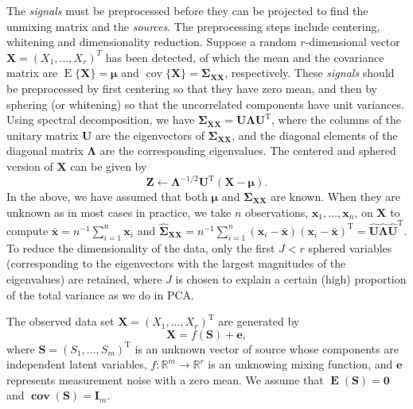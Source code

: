The \textit{signals} must be preprocessed before they can be projected to find the unmixing matrix and the \textit{sources}. The preprocessing steps include centering, whitening and dimensionality reduction. Suppose a random $r$-dimensional vector $\mathbf{X}=(X_1,\dots,X_r)^T$ has been detected, of which the mean and the covariance matrix are $\operatorname{E}\{\mathbf{X}\}=\boldsymbol{\mu}$ and $\operatorname{cov}\{\mathbf{X}\}=\boldsymbol{\Sigma}_{\mathbf{XX}}$, respectively. These \textit{signals} should be preprocessed by first centering so that they have zero mean, and then by sphering (or whitening) so that the uncorrelated components have unit variances. Using spectral decomposition, we have $\boldsymbol{\Sigma}_{\mathbf{XX}}=\mathbf{U}\boldsymbol{\Lambda}\mathbf{U}^{\operatorname{T}}$, where the columns of the unitary matrix $\mathbf{U}$ are the eigenvectors of $\boldsymbol{\Sigma}_{\mathbf{XX}}$, and the diagonal elements of the diagonal matrix $\boldsymbol{\Lambda}$ are the corresponding eigenvalues. The centered and sphered version of $\mathbf{X}$ can be given by
\begin{equation}
    \mathbf{Z}\leftarrow \boldsymbol{\Lambda}^{-1/2}\mathbf{U}^{\operatorname{T}}(\mathbf{X}-\boldsymbol{\mu}).
\end{equation}
In the above, we have assumed that both $\boldsymbol{\mu}$ and $\boldsymbol{\Sigma}_{\mathbf{XX}}$ are known. When they are unknown as in most cases in practice, we take $n$ observations, $\mathbf{x}_1, \dots, \mathbf{x}_n$, on $\mathbf{X}$ to compute $\bar{\mathbf{x}}=n^{-1}\sum_{i=1}^n\mathbf{x}_i$ and $\hat{\boldsymbol{\Sigma}}_{\mathbf{XX}}=n^{-1}\sum_{i=1}^n(\mathbf{x}_i-\bar{\mathbf{x}})(\mathbf{x}_i-\bar{\mathbf{x}})^{\operatorname{T}}=\hat{\mathbf{U}}\hat{\boldsymbol{\Lambda}}\hat{\mathbf{U}}^{\operatorname{T}}$. To reduce the dimensionality of the data, only the first $J < r$ sphered variables (corresponding to the eigenvectors with the largest magnitudes of the eigenvalues) are retained, where $J$ is chosen to explain a certain (high) proportion of the total variance as we do in PCA.

The observed data set $\mathbf{X}=(X_1,\dots,X_r)^{\operatorname{T}}$ are generated by
\begin{equation}
	\mathbf{X}=f(\mathbf{S})+\mathbf{e},
	\label{eq:DR:ICA:signalfromsource}
\end{equation}
where $\mathbf{S}=(S_1,\dots,S_m)^{\operatorname{T}}$ is an unknown vector of source whose components are independent latent variables, $f:\mathbb{R}^m\to \mathbb{R}^r$ is an unknowing mixing function, and $\mathbf{e}$ represents measurement noise with a zero mean. We assume that $\boldsymbol{\operatorname{E}}(\mathbf{S})=\mathbf{0}$ and $\boldsymbol{\operatorname{cov}}(\mathbf{S})=\mathbf{I}_m$. 

